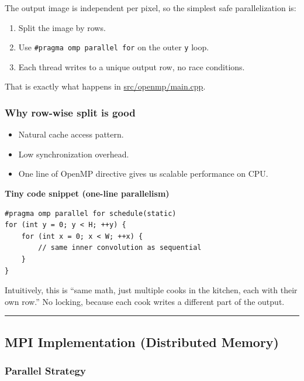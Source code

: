 \documentclass[
]{article}
\providecommand{\tightlist}{%
  \setlength{\itemsep}{0pt}\setlength{\parskip}{0pt}}
\begin{document}
The output image is independent per pixel, so the simplest safe
parallelization is:

\begin{enumerate}
\def\labelenumi{\arabic{enumi}.}
\tightlist
\item
  Split the image by rows.
\item
  Use \texttt{\#pragma\ omp\ parallel\ for} on the outer \texttt{y}
  loop.
\item
  Each thread writes to a unique output row, no race conditions.
\end{enumerate}

That is exactly what happens in \url{src/openmp/main.cpp}.

\subsubsection{Why row-wise split is
good}\label{why-row-wise-split-is-good}

\begin{itemize}
\tightlist
\item
  Natural cache access pattern.
\item
  Low synchronization overhead.
\item
  One line of OpenMP directive gives us scalable performance on CPU.
\end{itemize}

\textbf{Tiny code snippet (one-line parallelism)}

\begin{verbatim}
#pragma omp parallel for schedule(static)
for (int y = 0; y < H; ++y) {
    for (int x = 0; x < W; ++x) {
        // same inner convolution as sequential
    }
}
\end{verbatim}

Intuitively, this is ``same math, just multiple cooks in the kitchen,
each with their own row.'' No locking, because each cook writes a
different part of the output.

\begin{center}\rule{0.5\linewidth}{0.5pt}\end{center}

\subsection{MPI Implementation (Distributed
Memory)}\label{mpi-implementation-distributed-memory}

\subsubsection{Parallel Strategy}\label{parallel-strategy-1}
\end{document}
